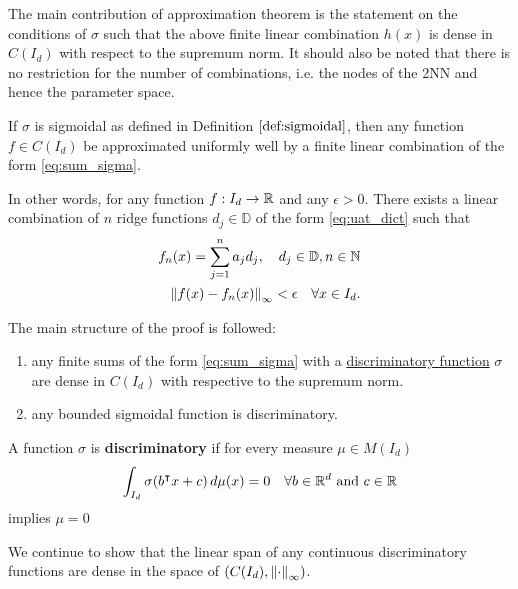 The main contribution of approximation theorem is the statement on the
conditions of $\sigma$ such that the above finite linear combination $h(x)$ is
dense in $C(I_d)$ with respect to the supremum norm. It should also be noted
that there is no restriction for the number of combinations, i.e. the nodes of
the 2NN and hence the parameter space.

\begin{theorem}
    \label{thm:uat}
    If $\sigma$ is sigmoidal as defined in Definition $\ref{def:sigmoidal}$,
    then any function $f \in C(I_d)$ be approximated uniformly well by a finite
    linear combination of the form \eqref{eq:sum_sigma}.

    In other words, for any function $f: I_d \to \mathbb{R}$ and any $\epsilon > 0$.
    There exists a linear combination of $n$ ridge functions $d_j \in
    \mathbb{D}$ of the form \eqref{eq:uat_dict} such that
    \begin{align}
        f_n(x) = \sum_{j=1}^n a_j d_j, \quad d_j \in \mathbb{D}, n\in\mathbb{N} \\
        \left\| f(x) - f_n(x) \right\|_{\infty} < \epsilon \quad \forall x \in I_d.
    \end{align}
\end{theorem}


The main structure of the proof is followed:
\begin{enumerate}
    \item any finite sums of the form \eqref{eq:sum_sigma} with a
    \hyperref[def:dis_func]{discriminatory function} $\sigma$ are dense in
    $C(I_d)$ with respective to the supremum norm.
    \item any bounded sigmoidal function is discriminatory.
\end{enumerate}

\begin{definition}
    \label{def:dis_func}
    A function $\sigma$ is \textbf{discriminatory} if for every measure $\mu \in
    M(I_d)$
    \begin{equation}
        \int_{I_d} \sigma(b{}^{\intercal} x + c) \,d\mu(x) = 0 \quad 
        \forall b \in \mathbb{R}^d \textnormal{ and } c \in \mathbb{R}
    \end{equation}
    implies $\mu = 0$
\end{definition}

We continue to show that the linear span of any continuous discriminatory
functions are dense in the space of $(C(I_d), \left\| \cdot \right\|_{\infty})$.

